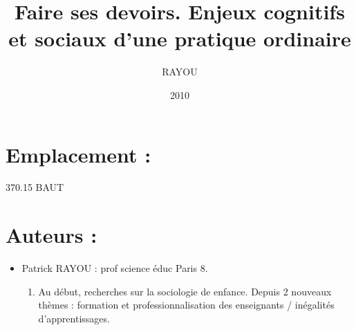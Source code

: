 \documentclass[12pt]{article}
\title{Faire ses devoirs. Enjeux cognitifs et sociaux d'une pratique ordinaire}
\author{RAYOU}
\date{2010}
\begin{document}
\maketitle
\section*{Emplacement :} 370.15 BAUT

\section*{Auteurs : }
\begin{itemize}
\item Patrick RAYOU : prof science éduc Paris 8.
\begin{enumerate}
\item Au début, recherches sur la sociologie de enfance. Depuis 2 nouveaux thèmes : formation et professionnalisation des enseignants / inégalités d'apprentissages.
\end{enumerate}
\end{itemize}
\end{document}
